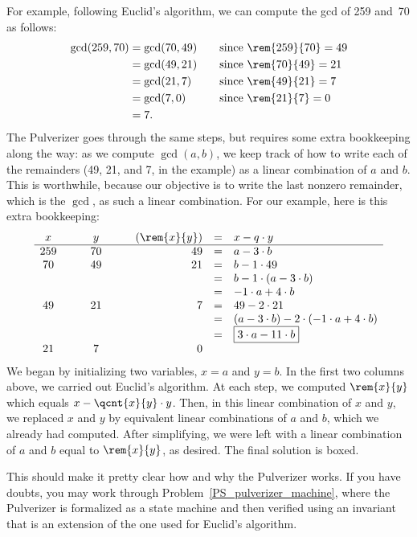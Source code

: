 For example, following Euclid's algorithm, we can compute the gcd of
259 and~70 as follows:
\begin{align*}
\gcd(259, 70) & = \gcd(70, 49) & \quad & \text{since $\rem{259}{70} = 49$}\\
 & = \gcd(49, 21) && \text{since $\rem{70}{49} = 21$} \\
 & = \gcd(21, 7) && \text{since $\rem{49}{21} = 7$} \\
 & = \gcd(7, 0)
                && \text{since $\rem{21}{7} = 0$} \\
 & = 7.
\end{align*}
The Pulverizer goes through the same steps, but requires some extra
bookkeeping along the way: as we compute $\gcd(a, b)$, we keep track
of how to write each of the remainders (49, 21, and 7, in the example)
as a linear combination of $a$ and $b$.  This is worthwhile, because
our objective is to write the last nonzero remainder, which is the
$\gcd$, as such a linear combination.  For our example, here is this
extra bookkeeping:
\[
\begin{array}{ccccrcl}
x & \quad & y & \quad & (\rem{x}{y}) & = & x - q \cdot y \\
\hline
259 && 70 && 49 & = & a - 3 \cdot  b\\
 70 && 49 && 21 & = & b - 1 \cdot 49 \\
           &&&& & = & b - 1 \cdot (a - 3 \cdot b) \\
           &&&& & = & -1 \cdot a + 4 \cdot b \\
 49 && 21 && 7  & = & 49 - 2 \cdot 21\\
           &&&& & = & (a - 3 \cdot b) - 2 \cdot (-1 \cdot a + 4 \cdot b) \\
           &&&& & = & \fbox{$3 \cdot a - 11 \cdot b$} \\
 21 && 7 && 0
\end{array}
\]
We began by initializing two variables, $x = a$ and $y = b$.  In the
first two columns above, we carried out Euclid's algorithm.  At each
step, we computed $\rem{x}{y}$ which equals $x - \qcnt{x}{y} \cdot y$.
Then, in this linear combination of $x$ and $y$, we replaced $x$ and
$y$ by equivalent linear combinations of $a$ and $b$, which we already
had computed.  After simplifying, we were left with a linear
combination of $a$ and $b$ equal to $\rem{x}{y}$, as desired.  The
final solution is boxed.

This should make it pretty clear how and why the Pulverizer works.  If
you have doubts, you may work through
Problem~\ref{PS_pulverizer_machine}, where the Pulverizer is
formalized as a state machine and then verified using an invariant
that is an extension of the one used for Euclid's algorithm.

